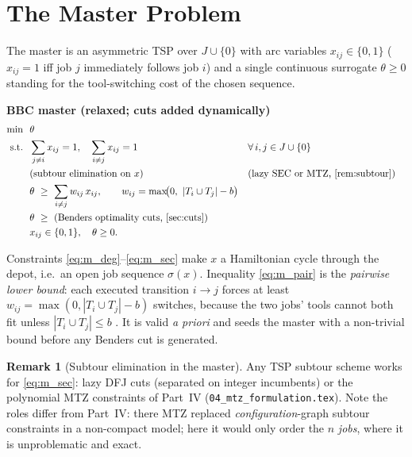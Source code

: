 \documentclass[11pt,a4paper]{article}
\theoremstyle{plain}
\theoremstyle{definition}
\newtheorem{remark}[theorem]{Remark}
\begin{document}
\section{The Master Problem}
\label{sec:master}

The master is an asymmetric TSP over $J\cup\{0\}$ with arc variables $x_{ij}\in\{0,1\}$
($x_{ij}=1$ iff job $j$ immediately follows job $i$) and a single continuous surrogate
$\theta\ge 0$ standing for the tool-switching cost of the chosen sequence.

\begin{formbox}
\textbf{BBC master (relaxed; cuts added dynamically)}
\begin{align}
  \min\ \ & \theta \label{eq:m_obj}\\
  \text{s.t.}\ \ & \sum_{j\neq i} x_{ij}=1,\quad \sum_{i\neq j} x_{ij}=1
     && \forall\, i,j\in J\cup\{0\} \label{eq:m_deg}\\
  & \text{(subtour elimination on } x) && \text{(lazy SEC or MTZ, \cref{rem:subtour})}\label{eq:m_sec}\\
  & \theta \ \ge\ \sum_{i\neq j} w_{ij}\, x_{ij},\qquad w_{ij}=\max\!\bigl(0,\ |T_i\cup T_j|-b\bigr)
     \label{eq:m_pair}\\
  & \theta \ \ge\ \text{(Benders optimality cuts, \cref{sec:cuts})} \label{eq:m_benders}\\
  & x_{ij}\in\{0,1\},\quad \theta\ge 0. \notag
\end{align}
\end{formbox}

Constraints \eqref{eq:m_deg}--\eqref{eq:m_sec} make $x$ a Hamiltonian cycle through the
depot, i.e.\ an open job sequence $\sigma(x)$. Inequality \eqref{eq:m_pair} is the
\emph{pairwise lower bound}: each executed transition $i\to j$ forces at least
$w_{ij}=\max(0,|T_i\cup T_j|-b)$ switches, because the two jobs' tools cannot both fit unless
$|T_i\cup T_j|\le b$ \cite{Tang1988,Laporte2004}. It is valid \emph{a priori} and seeds the
master with a non-trivial bound before any Benders cut is generated.

\begin{remark}[Subtour elimination in the master]
\label{rem:subtour}
Any TSP subtour scheme works for \eqref{eq:m_sec}: lazy DFJ cuts (separated on integer
incumbents) or the polynomial MTZ constraints of Part~IV
(\texttt{04\_mtz\_formulation.tex}). Note the roles differ from Part~IV: there MTZ replaced
\emph{configuration}-graph subtour constraints in a non-compact model; here it would only
order the $n$ \emph{jobs}, where it is unproblematic and exact.
\end{remark}
\end{document}

